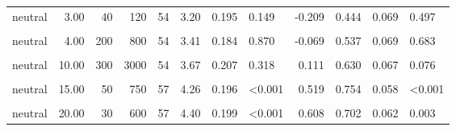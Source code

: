 \documentclass[
]{article}
\begin{document}
\begin{longtable}[t]{lrrrrrrlrrrl}
\hspace{1em}neutral & 3.00 & 40 & 120 & 54 & 3.20 & 0.195 & 0.149 & -0.209 & 0.444 & 0.069 & 0.497\\
\hspace{1em}\cellcolor{gray!10}{neutral} & \cellcolor{gray!10}{4.00} & \cellcolor{gray!10}{20} & \cellcolor{gray!10}{80} & \cellcolor{gray!10}{57} & \cellcolor{gray!10}{3.72} & \cellcolor{gray!10}{0.221} & \cellcolor{gray!10}{0.306} & \cellcolor{gray!10}{0.132} & \cellcolor{gray!10}{0.596} & \cellcolor{gray!10}{0.066} & \cellcolor{gray!10}{0.185}\\
\hspace{1em}neutral & 4.00 & 200 & 800 & 54 & 3.41 & 0.184 & 0.870 & -0.069 & 0.537 & 0.069 & 0.683\\
\hspace{1em}\cellcolor{gray!10}{neutral} & \cellcolor{gray!10}{10.00} & \cellcolor{gray!10}{40} & \cellcolor{gray!10}{400} & \cellcolor{gray!10}{57} & \cellcolor{gray!10}{4.14} & \cellcolor{gray!10}{0.212} & \cellcolor{gray!10}{0.005} & \cellcolor{gray!10}{0.404} & \cellcolor{gray!10}{0.702} & \cellcolor{gray!10}{0.062} & \cellcolor{gray!10}{0.003}\\
\hspace{1em}neutral & 10.00 & 300 & 3000 & 54 & 3.67 & 0.207 & 0.318 & 0.111 & 0.630 & 0.067 & 0.076\\
\hspace{1em}\cellcolor{gray!10}{neutral} & \cellcolor{gray!10}{15.00} & \cellcolor{gray!10}{20} & \cellcolor{gray!10}{300} & \cellcolor{gray!10}{54} & \cellcolor{gray!10}{3.72} & \cellcolor{gray!10}{0.209} & \cellcolor{gray!10}{0.226} & \cellcolor{gray!10}{0.146} & \cellcolor{gray!10}{0.648} & \cellcolor{gray!10}{0.066} & \cellcolor{gray!10}{0.040}\\
\hspace{1em}neutral & 15.00 & 50 & 750 & 57 & 4.26 & 0.196 & <0.001 & 0.519 & 0.754 & 0.058 & <0.001\\
\hspace{1em}\cellcolor{gray!10}{neutral} & \cellcolor{gray!10}{20.00} & \cellcolor{gray!10}{10} & \cellcolor{gray!10}{200} & \cellcolor{gray!10}{54} & \cellcolor{gray!10}{3.85} & \cellcolor{gray!10}{0.229} & \cellcolor{gray!10}{0.114} & \cellcolor{gray!10}{0.211} & \cellcolor{gray!10}{0.630} & \cellcolor{gray!10}{0.067} & \cellcolor{gray!10}{0.076}\\
\hspace{1em}neutral & 20.00 & 30 & 600 & 57 & 4.40 & 0.199 & <0.001 & 0.608 & 0.702 & 0.062 & 0.003\\

\end{longtable}
\end{document}
